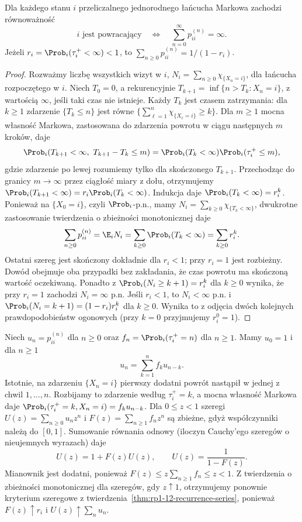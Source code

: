 \begin{twierdzenie}
\label{thm:rp1-12-recurrence-series}
Dla każdego stanu $i$ przeliczalnego jednorodnego
łańcucha Markowa zachodzi równoważność
\[
 i\text{ jest powracający}\quad\Longleftrightarrow
\quad\sum_{n=0}^{\infty}p_{ii}^{(n)}=\infty.
\]
Jeżeli $r_i=\Prob_i(\tau_i^+<\infty)<1$,
to $\sum_{n\geq0}p_{ii}^{(n)}=1/(1-r_i)$.
\end{twierdzenie}
\begin{proof}
Rozważmy liczbę wszystkich wizyt w $i$,
$N_i=\sum_{n\geq0}\chi_{\{X_n=i\}}$, dla łańcucha
rozpoczętego w $i$. Niech $T_0=0$, a rekurencyjnie
$T_{k+1}=\inf\{n>T_k:X_n=i\}$, z wartością $\infty$,
jeśli taki czas nie istnieje. Każdy $T_k$ jest czasem
zatrzymania: dla $k\geq1$ zdarzenie $\{T_k\leq n\}$
jest równe $\{\sum_{\ell=1}^n\chi_{\{X_\ell=i\}}\geq k\}$.
Dla $m\geq1$ mocna własność Markowa, zastosowana
do zdarzenia powrotu w ciągu następnych $m$ kroków,
daje
\[
\Prob_i(T_{k+1}<\infty,\ T_{k+1}-T_k\leq m)
=\Prob_i(T_k<\infty)\Prob_i(\tau_i^+\leq m),
\]
gdzie zdarzenie po lewej rozumiemy tylko dla
skończonego $T_{k+1}$. Przechodząc do granicy
$m\to\infty$ przez ciągłość miary z dołu,
otrzymujemy
$\Prob_i(T_{k+1}<\infty)=r_i\Prob_i(T_k<\infty)$.
Indukcja daje $\Prob_i(T_k<\infty)=r_i^k$.
Ponieważ na $\{X_0=i\}$, czyli $\Prob_i$-p.n.,
mamy $N_i=\sum_{k\geq0}\chi_{\{T_k<\infty\}}$,
dwukrotne zastosowanie twierdzenia o zbieżności monotonicznej daje
\[
\sum_{n\geq0}p_{ii}^{(n)}=\E_iN_i
=\sum_{k\geq0}\Prob_i(T_k<\infty)
=\sum_{k\geq0}r_i^k.
\]
Ostatni szereg jest skończony dokładnie dla $r_i<1$;
przy $r_i=1$ jest rozbieżny. Dowód obejmuje oba
przypadki bez zakładania, że czas powrotu ma
skończoną wartość oczekiwaną.
Ponadto z $\Prob_i(N_i\geq k+1)=r_i^k$ dla $k\geq0$
wynika, że przy $r_i=1$ zachodzi $N_i=\infty$ p.n.
Jeśli $r_i<1$, to $N_i<\infty$ p.n. i
$\Prob_i(N_i=k+1)=(1-r_i)r_i^k$ dla $k\geq0$.
Wynika to z odjęcia dwóch kolejnych prawdopodobieństw
ogonowych (przy $k=0$ przyjmujemy $r_i^0=1$).
\end{proof}

\begin{uwaga}
Niech $u_n=p_{ii}^{(n)}$ dla $n\geq0$ oraz
$f_n=\Prob_i(\tau_i^+=n)$ dla $n\geq1$.
Mamy $u_0=1$ i dla $n\geq1$
\[
u_n=\sum_{k=1}^n f_k u_{n-k}.
\]
Istotnie, na zdarzeniu $\{X_n=i\}$ pierwszy
dodatni powrót nastąpił w jednej z chwil $1,\ldots,n$.
Rozbijamy to zdarzenie według $\tau_i^+=k$,
a mocna własność Markowa daje
$\Prob_i(\tau_i^+=k,X_n=i)=f_k u_{n-k}$.
Dla $0\leq z<1$ szeregi
$U(z)=\sum_{n\geq0}u_nz^n$ i $F(z)=\sum_{n\geq1}f_nz^n$
są zbieżne, gdyż współczynniki należą do $[0,1]$.
Sumowanie równania odnowy (iloczyn Cauchy'ego
szeregów o nieujemnych wyrazach) daje
\[
U(z)=1+F(z)U(z),\qquad U(z)=\frac{1}{1-F(z)}.
\]
Mianownik jest dodatni, ponieważ
$F(z)\leq z\sum_{n\geq1}f_n\leq z<1$.
Z twierdzenia o zbieżności monotonicznej dla szeregów,
gdy $z\uparrow1$, otrzymujemy ponownie kryterium
szeregowe z twierdzenia~\ref{thm:rp1-12-recurrence-series},
ponieważ $F(z)\uparrow r_i$ i $U(z)\uparrow\sum_nu_n$.
\end{uwaga}

